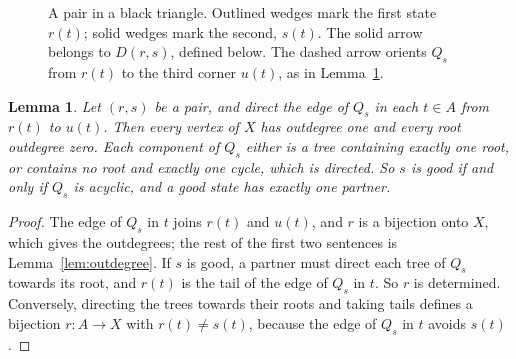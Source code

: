 \documentclass[10pt]{amsart}
\numberwithin{equation}{section}
\newtheorem{lemma}[equation]{Lemma}
\theoremstyle{definition}
\theoremstyle{remark}
\begin{document}
\begin{figure}[H]
\centering
\begin{minipage}{0.40\textwidth}\centering
{}
\end{minipage}\hfill
\begin{minipage}{0.56\textwidth}
\caption{A pair in a black triangle. Outlined wedges mark the first state $r(t)$; solid wedges mark the second, $s(t)$. The solid arrow belongs to $D(r,s)$, defined below. The dashed arrow orients $Q_s$ from $r(t)$ to the third corner $u(t)$, as in Lemma~\ref{lem:partner}.}
\label{fig:localpair}
\end{minipage}
\end{figure}

\begin{lemma}\label{lem:partner}
Let $(r,s)$ be a pair, and direct the edge of $Q_s$ in each $t\in A$ from $r(t)$ to $u(t)$.
Then every vertex of $X$ has outdegree one and every root outdegree zero.
Each component of $Q_s$ either is a tree containing exactly one root, or contains no root and exactly one cycle, which is directed.
So $s$ is good if and only if $Q_s$ is acyclic, and a good state has exactly one partner.
\end{lemma}

\begin{proof}
The edge of $Q_s$ in $t$ joins $r(t)$ and $u(t)$, and $r$ is a bijection onto $X$, which gives the outdegrees; the rest of the first two sentences is Lemma~\ref{lem:outdegree}.
If $s$ is good, a partner must direct each tree of $Q_s$ towards its root, and $r(t)$ is the tail of the edge of $Q_s$ in $t$. So $r$ is determined.
Conversely, directing the trees towards their roots and taking tails defines a bijection $r\colon A\to X$ with $r(t)\neq s(t)$, because the edge of $Q_s$ in $t$ avoids $s(t)$.
\end{proof}
\end{document}
